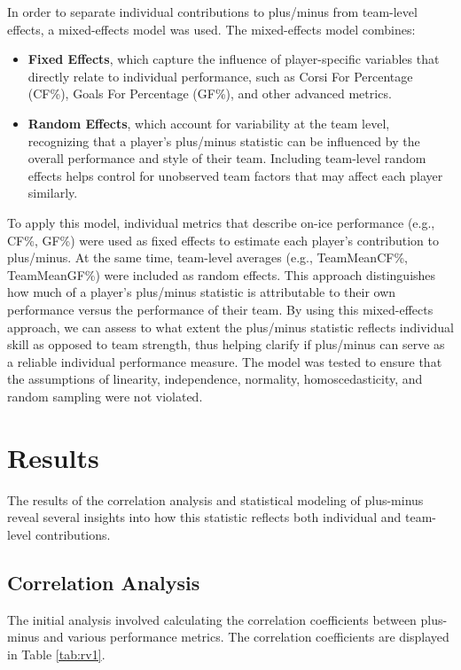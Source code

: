 \documentclass[12pt]{article}
\begin{document}
In order to separate individual contributions to plus/minus from team-level effects, a mixed-effects model was used. 
The mixed-effects model combines:
\begin{itemize}
    \item \textbf{Fixed Effects}, which capture the influence of player-specific variables that directly relate to individual performance, 
    such as Corsi For Percentage (CF\%), Goals For Percentage (GF\%), and other advanced metrics.
    \item \textbf{Random Effects}, which account for variability at the team level, recognizing that a player’s plus/minus statistic can be 
    influenced by the overall performance and style of their team. Including team-level random effects helps control for unobserved team 
    factors that may affect each player similarly.
\end{itemize}

To apply this model, individual metrics that describe on-ice performance (e.g., CF\%, GF\%) were used as fixed effects to estimate each player’s 
contribution to plus/minus. At the same time, team-level averages (e.g., TeamMeanCF\%, TeamMeanGF\%) were included as random effects. This 
approach distinguishes how much of a player's plus/minus statistic is attributable to their own performance versus the performance of their team.
By using this mixed-effects approach, we can assess to what extent the plus/minus statistic reflects individual skill as opposed to team 
strength, thus helping clarify if plus/minus can serve as a reliable individual performance measure. The model was tested to ensure that the
assumptions of linearity, independence, normality, homoscedasticity, and random sampling were not violated.


\section{Results}
\label{sec:resu}

The results of the correlation analysis and statistical modeling of plus-minus reveal several insights into how this statistic reflects 
both individual and team-level contributions.

\subsection{Correlation Analysis}

The initial analysis involved calculating the correlation coefficients between plus-minus and various performance metrics. The correlation 
coefficients are displayed in Table \ref{tab:rv1}.
\end{document}
